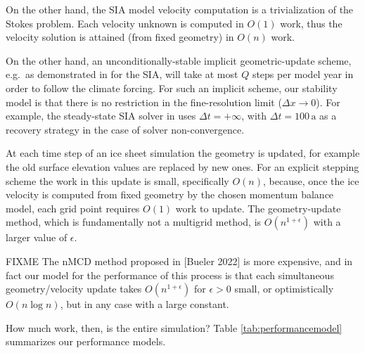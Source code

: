 \documentclass[twocolumn,letterpaper]{igs}
\newcommand\eps{\epsilon}
\begin{document}
On the other hand, the SIA model velocity computation is a trivialization of the Stokes problem.  Each velocity unknown is computed in $O(1)$ work, thus the velocity solution is attained (from fixed geometry) in $O(n)$ work.

On the other hand, an unconditionally-stable implicit geometric-update scheme, e.g.~as demonstrated in \citep{Bueler2016} for the SIA, will take at most $Q$ steps per model year in order to follow the climate forcing.  For such an implicit scheme, our stability model is that there is no restriction in the fine-resolution limit ($\Delta x \to 0$).  For example, the steady-state SIA solver in \cite{Bueler2016} uses $\Delta t=+\infty$, with $\Delta t = 100 \,\text{a}$ as a recovery strategy in the case of solver non-convergence.

At each time step of an ice sheet simulation the geometry is updated, for example the old surface elevation values are replaced by new ones.  For an explicit stepping scheme the work in this update is small, specifically $O(n)$, because, once the ice velocity is computed from fixed geometry by the chosen momentum balance model, each grid point requires $O(1)$ work to update.  The \cite{Bueler2016} geometry-update method, which is fundamentally not a multigrid method, is $O(n^{1+\eps})$ with a larger value of $\eps$.

FIXME The nMCD method proposed in [Bueler 2022] is more expensive, and in fact our model for the performance of this process is that each simultaneous geometry/velocity update takes $O(n^{1+\eps})$ for $\eps > 0$ small, or optimistically $O(n \log n)$, but in any case with a large constant.

How much work, then, is the entire simulation?  Table \ref{tab:performancemodel} summarizes our performance models.
\end{document}

